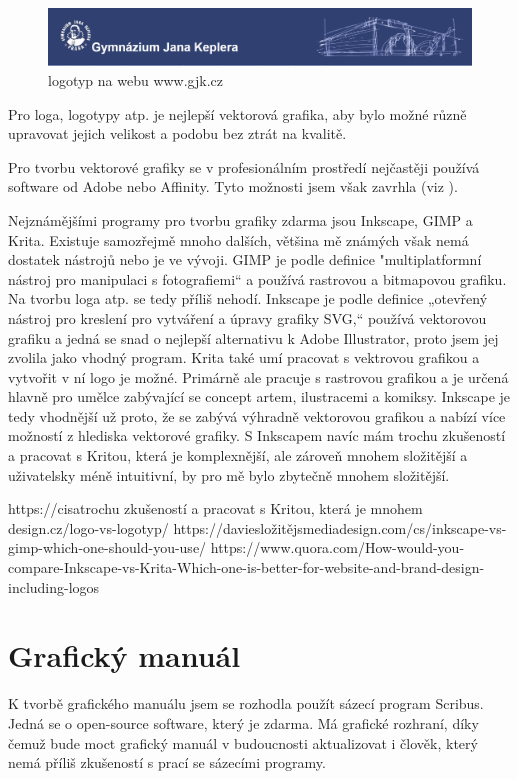\documentclass[11pt,a4paper,twoside,openright]{report}
\begin{document}
\begin{figure}[htbp]
  \includegraphics[width=1\textwidth]{img/gjk_web_hlavicka.png}
  \caption{logotyp na webu www.gjk.cz}
  \label{fig:logotyp_web}
\end{figure}


Pro loga, logotypy atp. je nejlepší vektorová grafika, aby bylo možné různě upravovat jejich velikost a podobu bez ztrát na kvalitě.

Pro tvorbu vektorové grafiky se v profesionálním prostředí nejčastěji používá software od Adobe nebo Affinity. Tyto možnosti jsem však zavrhla (viz ).

Nejznámějšími programy pro tvorbu grafiky zdarma jsou Inkscape, GIMP a Krita. Existuje samozřejmě mnoho dalších, většina mě známých však nemá dostatek nástrojů nebo je ve vývoji.
GIMP je podle definice "multiplatformní nástroj pro manipulaci s fotografiemi“ a používá rastrovou a bitmapovou grafiku. Na tvorbu loga atp. se tedy příliš nehodí.
Inkscape je podle definice „otevřený nástroj pro kreslení pro vytváření a úpravy grafiky SVG,“ používá vektorovou grafiku a jedná se snad o nejlepší alternativu k Adobe Illustrator, proto jsem jej zvolila jako vhodný program.
Krita také umí pracovat s vektrovou grafikou a vytvořit v ní logo je možné. Primárně ale pracuje s rastrovou grafikou a je určená hlavně pro umělce zabývající se concept artem, ilustracemi a komiksy. Inkscape je tedy vhodnější už proto, že se zabývá výhradně vektorovou grafikou a nabízí více možností z hlediska vektorové grafiky. S Inkscapem navíc mám trochu zkušeností a pracovat s Kritou, která je komplexnější, ale zároveň mnohem složitější a uživatelsky méně intuitivní, by pro mě bylo zbytečně mnohem složitější.


https://cisatrochu zkušeností a pracovat s Kritou, která je mnohem design.cz/logo-vs-logotyp/
https://daviesložitějsmediadesign.com/cs/inkscape-vs-gimp-which-one-should-you-use/
https://www.quora.com/How-would-you-compare-Inkscape-vs-Krita-Which-one-is-better-for-website-and-brand-design-including-logos

\section{Grafický manuál}
\label{sec:manual}
K tvorbě grafického manuálu jsem se rozhodla použít sázecí program Scribus. Jedná se o open-source software, který je zdarma. Má grafické rozhraní, díky čemuž bude moct grafický manuál v budoucnosti aktualizovat i člověk, který nemá příliš zkušeností s prací se sázecími programy.
\end{document}
